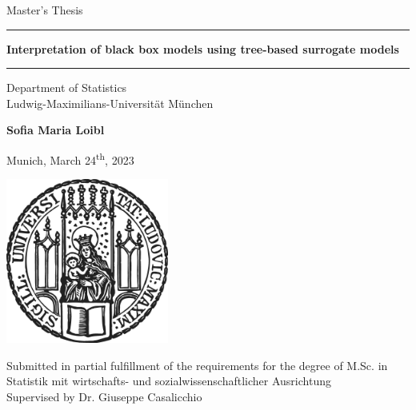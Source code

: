 \documentclass[12pt]{article}
\newcommand{\mytitle}{Interpretation of black box models using tree-based surrogate models}
\newcommand{\myname}{Sofia Maria Loibl}
\newcommand{\mysupervisor}{Dr. Giuseppe Casalicchio}
\begin{document}
 
\begin{titlepage}
\begin{center}
    
\LARGE
Master's Thesis
    
\vspace{0.5cm}
      
\rule{\textwidth}{1.5pt}
\LARGE
\textbf{\mytitle}
\rule{\textwidth}{1.5pt}
   
\vspace{0.5cm}
      
\large
Department of Statistics \\
Ludwig-Maximilians-Universität München 

\vfill

\Large
\textbf{\myname}

\vfill

\large
Munich, March 24\textsuperscript{th}, 2023
      
\vfill

\includegraphics[width = 0.4\textwidth]{sigillum.png}

\vfill

\normalsize
Submitted in partial fulfillment of the requirements for the degree of M.Sc. in Statistik mit wirtschafts- und sozialwissenschaftlicher Ausrichtung \\
Supervised by \mysupervisor

\end{center}
\end{titlepage}


\newpage
\end{document}
